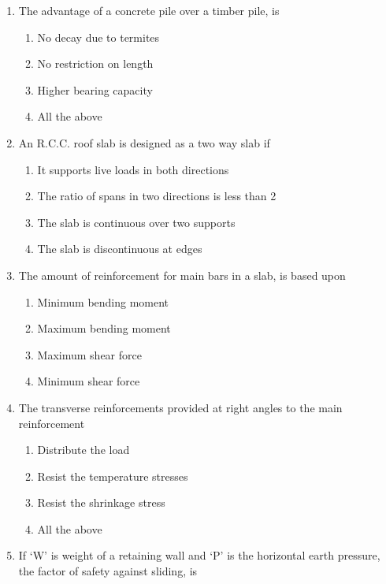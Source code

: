 \documentclass[11pt,a4paper]{article}
\begin{document}
\begin{enumerate}
\\\begin{enumerate*}[itemjoin=\qquad, label=\Alph*.]
\item{12 mm}
\item{6 mm}
\item{20 mm}
\item{22 mm}
\end{enumerate*}
\item{The advantage of a concrete pile over a timber pile, is}
\begin{enumerate}[label=\Alph*.]
\item{No decay due to termites}
\item{No restriction on length}
\item{Higher bearing capacity}
\item{All the above}
\end{enumerate}
\item{An R.C.C. roof slab is designed as a two way slab if}
\begin{enumerate}[label=\Alph*.]
\item{It supports live loads in both directions}
\item{The ratio of spans in two directions is less than 2}
\item{The slab is continuous over two supports}
\item{The slab is discontinuous at edges}
\end{enumerate}
\item{The amount of reinforcement for main bars in a slab, is based upon}
\begin{enumerate}[label=\Alph*.]
\item{Minimum bending moment}
\item{Maximum bending moment}
\item{Maximum shear force}
\item{Minimum shear force}
\end{enumerate}
\item{The transverse reinforcements provided at right angles to the main reinforcement}
\begin{enumerate}[label=\Alph*.]
\item{Distribute the load}
\item{Resist the temperature stresses}
\item{Resist the shrinkage stress}
\item{All the above}
\end{enumerate}
\item{If `W' is weight of a retaining wall and `P' is the horizontal earth pressure, the factor of safety against sliding, is
}
\end{enumerate}
\end{document}
